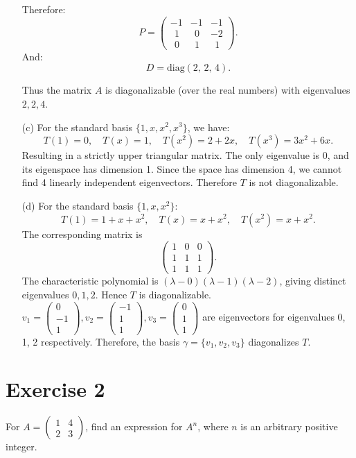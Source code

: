 \documentclass{article}
\begin{document}
\begin{itemize}
Therefore:
\[
P
=
\begin{pmatrix}
-1 & -1 & -1 \\
\;\,1 & \;\,0 & -2 \\
\;\,0 & \;\,1 & \;\,1
\end{pmatrix}.
\]
And:
\[
D
=
\mathrm{diag}(2,\,2,\,4).
\]

Thus the matrix \(A\) is diagonalizable (over the real numbers) with eigenvalues \(2, 2, 4\).
    
    \item[(c)]
    For the standard basis \(\{1, x, x^2, x^3\}\), we have:
    \[
    T(1) = 0,\quad
    T(x) = 1,\quad
    T(x^2) = 2 + 2x,\quad
    T(x^3) = 3x^2 + 6x.
    \]
    Resulting in a strictly upper triangular matrix. The only eigenvalue is 0, and its eigenspace has dimension 1. Since the space has dimension 4, we cannot find 4 linearly independent eigenvectors. Therefore \(T\) is not diagonalizable.
    
    \item[(d)]
    For the standard basis \(\{1, x, x^2\}\):
    \[
    T(1) = 1 + x + x^2,\quad
    T(x) = x + x^2,\quad
    T(x^2) = x + x^2.
    \]
    The corresponding matrix is
    \[
    \begin{pmatrix}
    1 & 0 & 0\\
    1 & 1 & 1\\
    1 & 1 & 1
    \end{pmatrix}.
    \]
    The characteristic polynomial is \((\lambda - 0)(\lambda - 1)(\lambda - 2)\), giving distinct eigenvalues \(0, 1, 2\). Hence \(T\) is diagonalizable. $v_1 = \begin{pmatrix}0 \\ -1 \\ 1\end{pmatrix}, v_2 = \begin{pmatrix}-1 \\ 1 \\ 1\end{pmatrix}, v_3 = \begin{pmatrix}0 \\ 1 \\ 1\end{pmatrix}$ are eigenvectors for eigenvalues 0, 1, 2 respectively. Therefore, the basis $\gamma = \{v_1, v_2, v_3\}$ diagonalizes $T$.
    \end{itemize}

\newpage

\section*{Exercise 2}
For $A = \begin{pmatrix} 1 & 4 \\ 2 & 3 \end{pmatrix}$, find an expression for $A^n$, where $n$ is an arbitrary positive integer. \\
\end{document}
